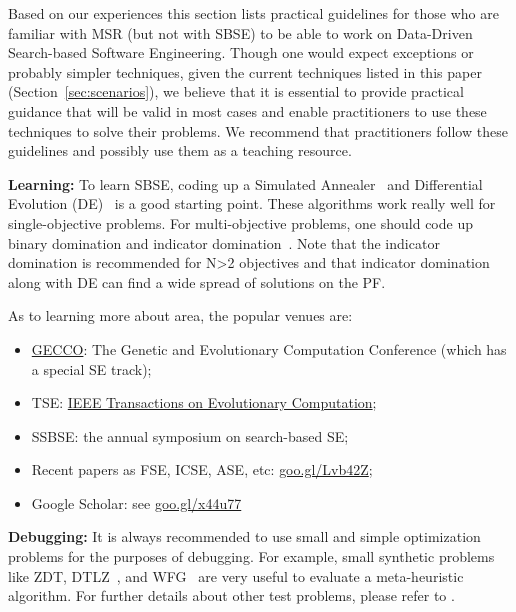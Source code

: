 \documentclass[sigconf,anonymous,review]{acmart}
\newcommand\TODO[1]{\textcolor{ScarletRed}{\textbf{\colorbox{yellow}{\small TODO:}} \emph{#1}}\xspace}
\begin{document}


Based on our experiences this section lists practical guidelines for those who are familiar with MSR (but not with SBSE) to be able to work on Data-Driven Search-based Software Engineering. 
Though one would expect exceptions or probably simpler techniques, given the current techniques listed in this paper (Section~\ref{sec:scenarios}), we believe that it is essential to provide practical guidance that will be valid in most cases and enable practitioners to use these techniques to solve their problems. 
We recommend that practitioners follow these guidelines and possibly use them as a teaching resource.

 
\noindent\textbf{Learning: } To learn SBSE, coding up a Simulated Annealer~\cite{van1987simulated} and Differential Evolution (DE)~\cite{storn97} is a good starting point.  These algorithms work really well for single-objective problems. For multi-objective problems, one should code up binary domination and indicator domination~\cite{zitzler2001spea2}. Note that the indicator domination is recommended for N>2 objectives and that indicator domination along with DE can find a wide spread of solutions on the PF. 

As to learning more about area, the popular venues are: 
\begin{itemize}[leftmargin=*]
\item \href{http://gecco-2018.sigevo.org/index.html/HomePage}{GECCO}: The Genetic and Evolutionary Computation Conference (which has a special SE track);
\item TSE: \href{http://ieeexplore.ieee.org/xpl/RecentIssue.jsp?punumber=4235}{IEEE Transactions on Evolutionary Computation};
\item SSBSE: the annual symposium on search-based SE;
\item Recent papers   as FSE, ICSE, ASE, etc: \url{goo.gl/Lvb42Z};
\item Google Scholar: see  \url{goo.gl/x44u77}
\end{itemize}
  \noindent\textbf{Debugging: } It is always recommended to use small and simple {optimization problems} for the purposes of debugging. For example, small synthetic {problems} like ZDT, DTLZ~\cite{deb2005scalable}, and WFG~\cite{huband2006review} are very useful to evaluate a meta-heuristic algorithm. For further details about other test problems, please refer to \cite{huband2006review}.  
  
\end{document}
